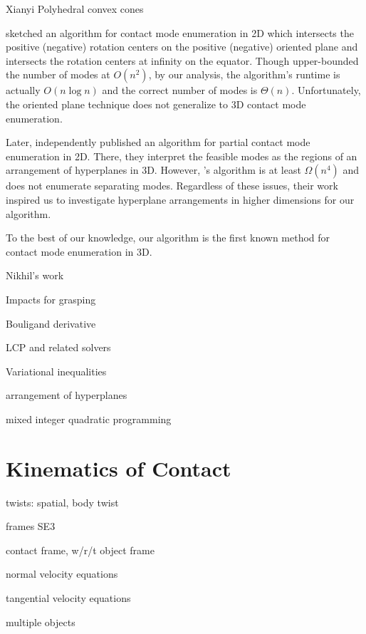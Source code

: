 \documentclass[conference]{IEEEtran}
\newcommand{\TODO}[1]{{\color{red} {{#1}}}}
\begin{document}
\begin{inparaenum}
    \item \TODO{Xianyi} Polyhedral convex cones
    \item \citet{mason_mechanics_2001} sketched an algorithm for contact mode
    enumeration in 2D which intersects the positive (negative) rotation centers
    on the positive (negative) oriented plane and intersects the rotation
    centers at infinity on the equator. Though \citet{mason_mechanics_2001}
    upper-bounded the number of modes at $O(n^2)$, by our analysis, the
    algorithm's runtime is actually $O(n\log n)$ and the correct number of modes
    is $\Theta(n)$. Unfortunately, the oriented plane technique does not
    generalize to 3D contact mode enumeration.
    \item Later, \citet{haas-heger_passive_2018} independently published an
    algorithm for partial contact mode enumeration in 2D. There, they interpret
    the feasible modes as the regions of an arrangement of hyperplanes in 3D.
    However, \citet{haas-heger_passive_2018}'s algorithm is at least
    $\Omega(n^4)$ and does not enumerate separating modes. Regardless of these
    issues, their work inspired us to investigate hyperplane arrangements in
    higher dimensions for our algorithm.
    \item To the best of our knowledge, our algorithm is the first known method
    for contact mode enumeration in 3D.
    \item Nikhil's work
    \item Impacts for grasping
    \item Bouligand derivative
    \item LCP and related solvers
    \item Variational inequalities
    \item arrangement of hyperplanes
    \item mixed integer quadratic programming
\end{inparaenum}

\section{Kinematics of Contact}

\TODO
{
\begin{inparaenum}
    \item twists: spatial, body twist
    \item frames SE3
    \item contact frame, w/r/t object frame
    \item normal velocity equations
    \item tangential velocity equations
    \item multiple objects
\end{inparaenum}
}
\end{document}
